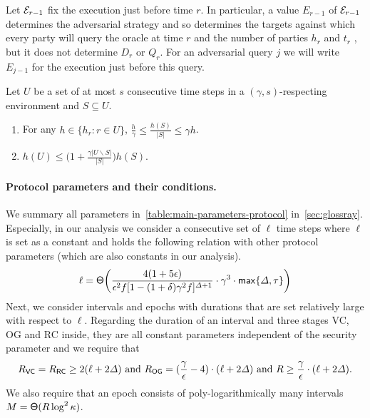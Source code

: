 Let $\mathcal{E}_{r - 1}$ fix the execution just before time $r$.
%
In particular, a value $E_{r - 1}$ of $\mathcal{E}_{r - 1}$ determines the adversarial strategy and so determines the targets against which every party will query the oracle at time $r$ and the number of parties $h_r$ and $t_r$ , but it does not determine $D_r$ or $Q_r$.
%
For an adversarial query $j$ we will write $E_{j - 1}$ for the execution just before this query.

\begin{fact}
    \label{fact:respecting-env-inequalities}

    Let $U$ be a set of at most $s$ consecutive time steps in a $(\gamma, s)$-respecting environment and $S \subseteq U$.
    \begin{enumerate}[label=(\alph*),leftmargin=*,nosep]
        \item For any $h \in \{h_r : r \in U \}$, $\frac{h}{\gamma} \le \frac{h(S)}{|S|} \le \gamma h$.

        \item $h(U) \le \big(1 + \frac{\gamma |U \backslash S|}{|S|} \big) h(S)$.
    \end{enumerate}
\end{fact}

\paragraph{Protocol parameters and their conditions.}
%
We summary all \pSMR parameters in~\cref{table:main-parameters-protocol} in~\cref{sec:glossray}.
%
Especially, in our analysis we consider a consecutive set of $\ell$ time steps where $\ell$ is set as a constant and holds the following relation with other protocol parameters (which are also constants in our analysis).
%
\begin{equation} \label{eq:ell-definition}
    \ell = \mathsf{\Theta} \bigg( \frac{4(1 + 5\epsilon)}{\epsilon^2 f [1 - (1 + \delta) \gamma^2 f]^{\varDelta + 1}} \cdot \gamma^3 \cdot \mathsf{max} \{ \varDelta, \tau \} \bigg)
\end{equation}
%
Next, we consider intervals and epochs with durations that are set relatively large with respect to $\ell$.
%
Regarding the duration of an interval and three stages \textsf{VC}, \textsf{OG} and \textsf{RC} inside, they are all constant parameters independent of the security parameter and we require that
%
\begin{equation} \label{eq:sync-duration}
    R_{\mathsf{VC}} = R_{\mathsf{RC}} \ge 2(\ell + 2 \varDelta)
    ~\mathrm{and}~
    R_{\mathsf{OG}} = (\frac{\gamma}{\epsilon} - 4) \cdot (\ell + 2\varDelta)
    ~\mathrm{and}~
    R \ge \frac{\gamma}{\epsilon} \cdot (\ell + 2\varDelta).
\end{equation}
%
We also require that an epoch consists of poly-logarithmically many intervals $ M = \mathsf{\Theta}(R \log^2 \kappa)$.

